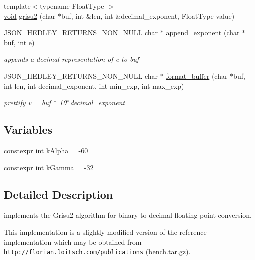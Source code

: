 \begin{DoxyCompactItemize}
\item 
{\footnotesize template$<$typename Float\+Type $>$ }\\\hyperlink{namespacenlohmann_1_1detail_a59fca69799f6b9e366710cb9043aa77d}{void} \hyperlink{namespacenlohmann_1_1detail_1_1dtoa__impl_aab7a9670a4f4704a5d0347ad7588576b}{grisu2} (char $\ast$buf, int \&len, int \&decimal\+\_\+exponent, Float\+Type value)
\item 
J\+S\+O\+N\+\_\+\+H\+E\+D\+L\+E\+Y\+\_\+\+R\+E\+T\+U\+R\+N\+S\+\_\+\+N\+O\+N\+\_\+\+N\+U\+LL char $\ast$ \hyperlink{namespacenlohmann_1_1detail_1_1dtoa__impl_ad90f19ed10d8133b727df4b9bc5ddf5c}{append\+\_\+exponent} (char $\ast$buf, int e)
\begin{DoxyCompactList}\small\item\em appends a decimal representation of e to buf \end{DoxyCompactList}\item 
J\+S\+O\+N\+\_\+\+H\+E\+D\+L\+E\+Y\+\_\+\+R\+E\+T\+U\+R\+N\+S\+\_\+\+N\+O\+N\+\_\+\+N\+U\+LL char $\ast$ \hyperlink{namespacenlohmann_1_1detail_1_1dtoa__impl_ab441f2761e33839ca48bc2225e14a2a9}{format\+\_\+buffer} (char $\ast$buf, int len, int decimal\+\_\+exponent, int min\+\_\+exp, int max\+\_\+exp)
\begin{DoxyCompactList}\small\item\em prettify v = buf $\ast$ 10$^\wedge$decimal\+\_\+exponent \end{DoxyCompactList}\end{DoxyCompactItemize}
\subsection*{Variables}
\begin{DoxyCompactItemize}
\item 
constexpr int \hyperlink{namespacenlohmann_1_1detail_1_1dtoa__impl_ac1ea1316de0b4a219f707c76b1db1966}{k\+Alpha} = -\/60
\item 
constexpr int \hyperlink{namespacenlohmann_1_1detail_1_1dtoa__impl_a4a750fcc38da1ce68b7e25ab3a230e20}{k\+Gamma} = -\/32
\end{DoxyCompactItemize}


\subsection{Detailed Description}
implements the Grisu2 algorithm for binary to decimal floating-\/point conversion. 

This implementation is a slightly modified version of the reference implementation which may be obtained from \href{http://florian.loitsch.com/publications}{\tt http\+://florian.\+loitsch.\+com/publications} (bench.\+tar.\+gz).

